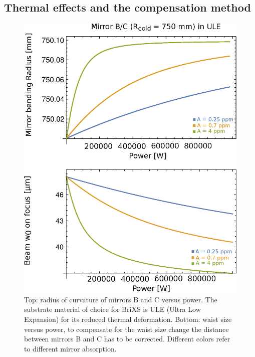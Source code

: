 \subsection{Thermal effects and the compensation method}
\begin{figure}
	\centering
	\includegraphics[width=0.9\linewidth]{images/mirrordef.eps}
	\caption{Top: radius of curvature of mirrors B and C versus power. The substrate material of choice for BriXS is ULE (Ultra Low Expansion) for its reduced thermal deformation. Bottom: waist size versus power, to compensate for the waist size change the distance between mirrors B and C has to be corrected. Different colors refer to different mirror absorption.}
	\label{fig:mirrordef}
\end{figure}
